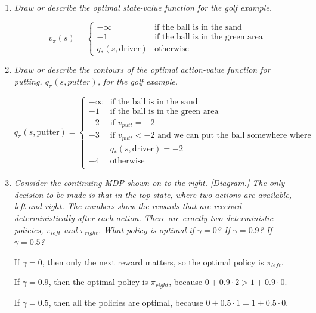 \documentclass[12pt,a4paper]{article}
\begin{document}
\begin{enumerate}
\item
  \textit{Draw or describe the optimal state-value function for the golf example.}

  \[
  v_\pi(s) =
  \begin{cases}
    -\infty & \text{if the ball is in the sand}\\
    -1 & \text{if the ball is in the green area}\\
    q_*(s, \text{driver}) & \text{otherwise}
  \end{cases}
  \]

\item
  \textit{Draw or describe the contours of the optimal action-value function for
  putting, $q_\pi(s, putter)$, for the golf example.}

  \[
  q_\pi(s, \text{putter}) =
  \begin{cases}
    -\infty & \text{if the ball is in the sand}\\
    -1 & \text{if the ball is in the green area}\\
    -2 & \text{if } v_{putt} = -2\\
    -3 & \text{if } v_{putt} < -2 \text{ and we can put the ball somewhere where }\\
    & q_*(s, \text{driver}) = -2\\
    -4 & \text{otherwise}\\
  \end{cases}
  \]

\item
  \textit{Consider the continuing MDP shown on to the right. [Diagram.] The only decision
  to be made is that in the top state, where two actions are available, left and right.
  The numbers show the rewards that are received deterministically after
  each action. There are exactly two deterministic policies,
  $\pi_{left}$ and $\pi_{right}$. What policy is optimal if $\gamma = 0$? If $\gamma = 0.9$?
  If $\gamma = 0.5$?}

  If $\gamma = 0$, then only the next reward matters, so the optimal policy is
  $\pi_{left}$.

  If $\gamma = 0.9$, then the optimal policy is $\pi_{right}$, because $0 + 0.9 \cdot 2 > 1 + 0.9 \cdot 0$.

  If $\gamma = 0.5$, then all the policies are optimal, because $0 + 0.5 \cdot 1 = 1 + 0.5 \cdot 0.$


\end{enumerate}
\end{document}
